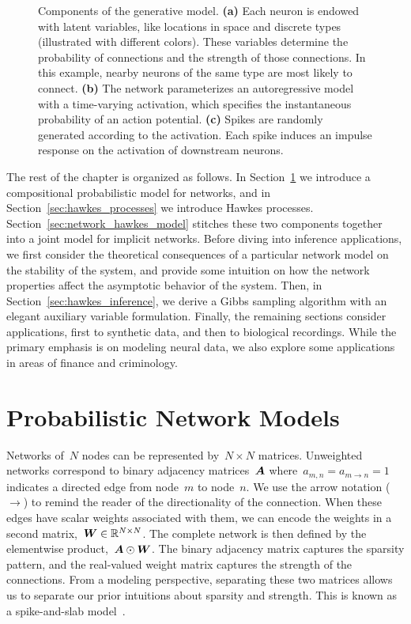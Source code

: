 \begin{figure}[t]
\begin{subfigure}[b]{1.7in}
    \label{fig:fig1_spikes}
  \end{subfigure}
  \vspace{-.2in}
  \caption[Components of the network Hawkes model]{
     Components of the generative model. 
     \textbf{(a)} Each neuron is endowed with latent variables, like 
     locations in space and discrete types (illustrated with different colors).
     These variables determine the probability of connections and the 
     strength of those connections. In this example, nearby neurons of the same 
     type are most likely to connect.
     \textbf{(b)} The network parameterizes an autoregressive model 
     with a time-varying activation, which specifies the instantaneous probability 
     of an action potential.
     \textbf{(c)} Spikes are randomly generated according to the 
     activation. Each spike induces an impulse response on the activation 
     of downstream neurons.}
  \label{fig:network_hawkes}
\end{figure}

The rest of the chapter is organized as follows. In
Section~\ref{sec:graph_models} we introduce a compositional
probabilistic model for networks, and in
Section~\ref{sec:hawkes_processes} we introduce Hawkes processes.
Section~\ref{sec:network_hawkes_model} stitches these two components
together into a joint model for implicit networks.  Before diving into
inference applications, we first consider the theoretical consequences
of a particular network model on the stability of the system, and
provide some intuition on how the network properties affect the
asymptotic behavior of the system.  Then, in
Section~\ref{sec:hawkes_inference}, we derive a Gibbs sampling
algorithm with an elegant auxiliary variable formulation.  Finally,
the remaining sections consider applications, first to synthetic data,
and then to biological recordings.  While the primary emphasis is on
modeling neural data, we also explore some applications in areas of
finance and criminology.

\section{Probabilistic Network Models}
\label{sec:graph_models}
Networks of~$N$ nodes can be represented by~${N\times N}$
matrices. Unweighted networks correspond to binary adjacency
matrices~$\boldsymbol{A}$ where~${a_{m,n}=a_{m \to n}=1}$ indicates a directed
edge from node~$m$ to node~$n$. We use the arrow notation ($\to$) to
remind the reader of the directionality of the connection. When these
edges have scalar weights associated with them, we can encode the
weights in a second matrix,~${\boldsymbol{W} \in \mathbb{R}^{N \times N}}$.  The
complete network is then defined by the elementwise product,~${\boldsymbol{A}
  \odot \boldsymbol{W}}$. The binary adjacency matrix captures the sparsity
pattern, and the real-valued weight matrix captures the strength of
the connections. From a modeling perspective, separating these two
matrices allows us to separate our prior intuitions about sparsity and
strength. This is known as a spike-and-slab model~\citep{Mitchell1988}.


